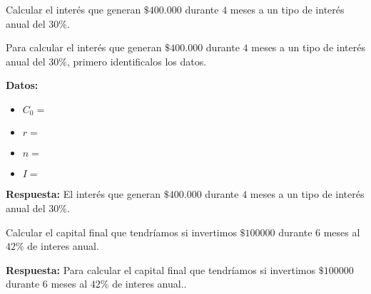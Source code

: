 \documentclass[12pt]{examdesign}
\theoremstyle{plain}
\theoremstyle{definition}
\theoremstyle{remark}
\begin{document}
    \begin{shortanswer}[title={Leemos el material de consulta y realizamos las actividades propuestas.}, rearrange=no]
    	\begin{question}
    		Calcular el interés que generan $\$400.000$ durante $4$ meses a un tipo de interés anual del $30\%$.
    	    \begin{answer}
    	    	Para calcular el interés que generan $\$400.000$ durante $4$ meses a un tipo de interés anual del $30\%$, primero identificalos los datos.
    	    	
    	    	\textbf{Datos:}
    	    	
    	    	\begin{itemize}
    	    		\item $C_{0}=$
    	    		\item $r=$
    	    		\item $n=$
    	    		\item $I=$
    	    	\end{itemize}
        	
    	    	\textbf{Respuesta:} El interés que generan $\$400.000$ durante $4$ meses a un tipo de interés anual del $30\%$.
    	    \end{answer}
    	\end{question}
        
        \begin{question}
        	Calcular el capital final que tendríamos si invertimos $\$100000$ durante $6$ meses al $42\%$ de interes anual.	
        	\begin{answer}
        		\textbf{Respuesta:} Para calcular el capital final que tendríamos si invertimos $\$100000$ durante $6$ meses al $42\%$ de interes anual..
        			    

\end{answer}
\end{question}
\end{shortanswer}
\end{document}
